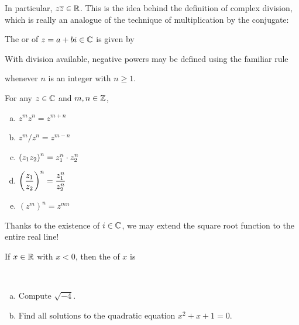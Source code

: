 \documentclass[11pt,fleqn,dvipsnames,usenames]{article}
\newcommand{\p}{\noindent}
\begin{document}
\p In particular, $z\overline{z}\in\mathbb{R}$.  This is the idea behind the definition of complex division, which is really an analogue of the technique of {multiplication by the conjugate}:
\vfill

\begin{definition}
The  or  of $z = a+bi\in\mathbb{C}$ is given by
\end{definition}
\newpage

\p With division available, negative powers may be defined using the familiar rule
\vspace{2cm}

\p whenever $n$ is an integer with $n\geq 1$.
\vsp

\properties For any $z\in\mathbb{C}$ and $m,n\in\mathbb{Z}$,
\begin{enumerate}[(a)]
\item $z^{m}z^{n} = z^{m+n}$
\item $z^{m}/z^{n} = z^{m-n}$
\item $\displaystyle{\left(z_{1}z_{2}\right)^{n} = z_{1}^{n}\cdot z_{2}^{n}}$
\item $\displaystyle{\left(\frac{z_{1}}{z_{2}}\right)^{n} = \frac{z_{1}^{n}}{z_{2}^{n}}}$
\item $\left(z^{m}\right)^{n} = z^{mn}$
\end{enumerate}
\vsp

\p Thanks to the existence of $i\in\mathbb{C}$, we may extend the square root function to the entire real line!
\vsp

\begin{definition}
If $x\in\mathbb{R}$ with $x < 0$, then the  of $x$ is
\end{definition}
\vsp

\begin{examples}~
\begin{enumerate}[(a)]
\item Compute $\sqrt{-4}$.
\item Find all solutions to the quadratic equation $x^2 + x + 1 = 0$.
\end{enumerate}
\end{examples}
%
\begin{solution}
\newpage

\end{solution}
\end{document}
